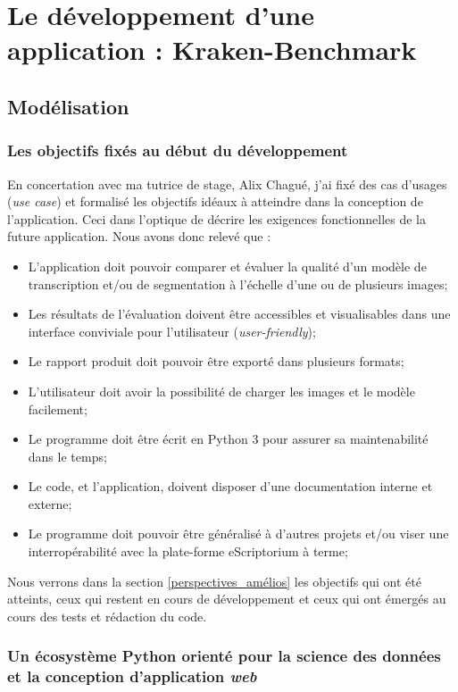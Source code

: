 \chapter{Le développement d'une application : Kraken-Benchmark}

\section{Modélisation}

\subsection{Les objectifs fixés au début du développement}\label{objectifs}
En concertation avec ma tutrice de stage, Alix Chagué, j'ai fixé des cas d'usages (\textit{use case}) et formalisé les objectifs idéaux à atteindre dans la conception de l'application. Ceci dans l'optique de  décrire les exigences fonctionnelles de la future application. Nous avons donc relevé que :

\begin{itemize}
    \item L'application doit pouvoir comparer et évaluer la qualité d'un modèle de transcription et/ou de segmentation à l'échelle d'une ou de plusieurs images;
    \item Les résultats de l'évaluation doivent être accessibles et visualisables dans une interface conviviale pour l'utilisateur (\textit{user-friendly});
    \item Le rapport produit doit pouvoir être exporté dans plusieurs formats;
    \item L'utilisateur doit avoir la possibilité de charger les images et le modèle facilement;
    \item Le programme doit être écrit en Python 3 pour assurer sa  maintenabilité dans le temps;
    \item Le code, et l'application, doivent disposer d'une documentation interne et externe;
    \item Le programme doit pouvoir être généralisé à d'autres projets et/ou viser une interropérabilité avec la plate-forme eScriptorium à terme;
\end{itemize}

Nous verrons dans la section \ref{perspectives_amélios} les objectifs qui ont été atteints, ceux qui restent en cours de développement et ceux qui ont émergés au cours des tests et rédaction du code. 

\subsection{Un écosystème Python orienté pour la science des données et la conception d'application \textit{web}}

